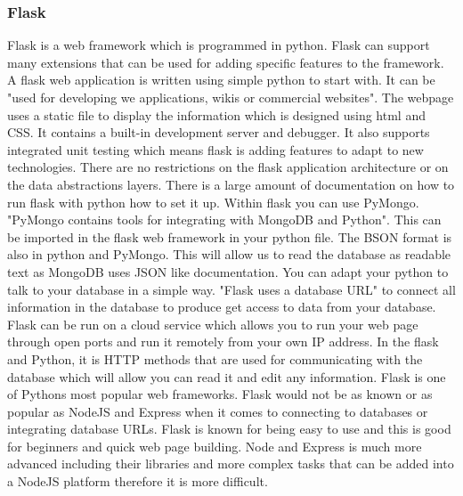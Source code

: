 \subsubsection{Flask}
Flask is a web framework which is programmed in python. Flask can support many extensions that can be used for adding specific features to the framework. A flask web application is written using simple python to start with. It can be "used for developing we applications, wikis or commercial websites".\cite{FlaskInfo} The webpage uses a static file to display the information which is designed using html and CSS. It contains a built-in development server and debugger. It also supports integrated unit testing which means flask is adding features to adapt to new technologies. There are no restrictions on the flask application architecture or on the data abstractions layers. There is a large amount of documentation on how to run flask with python how to set it up. Within flask you can use PyMongo. "PyMongo contains tools for integrating with MongoDB and Python".\cite{PyMongo} This can be imported in the flask web framework in your python file. The BSON format is also in python and PyMongo. This will allow us to read the database as readable text as MongoDB uses JSON like documentation.\cite{PyMongo} You can adapt your python to talk to your database in a simple way. "Flask uses a database URL" to connect all information in the database to produce get access to data from your database.\cite{FlaskPy} Flask can be run on a cloud service which allows you to run your web page through open ports and run it remotely from your own IP address. In the flask and Python, it is HTTP methods that are used for communicating with the database which will allow you can read it and edit any information. \cite{FlaskPy} Flask is one of Pythons most popular web frameworks. Flask would not be as known or as popular as NodeJS and Express when it comes to connecting to databases or integrating database URLs. Flask is known for being easy to use and this is good for beginners and quick web page building. \cite{Flask} Node and Express is much more advanced including their libraries and more complex tasks that can be added into a NodeJS platform therefore it is more difficult.\cite{FlaskVNode}
